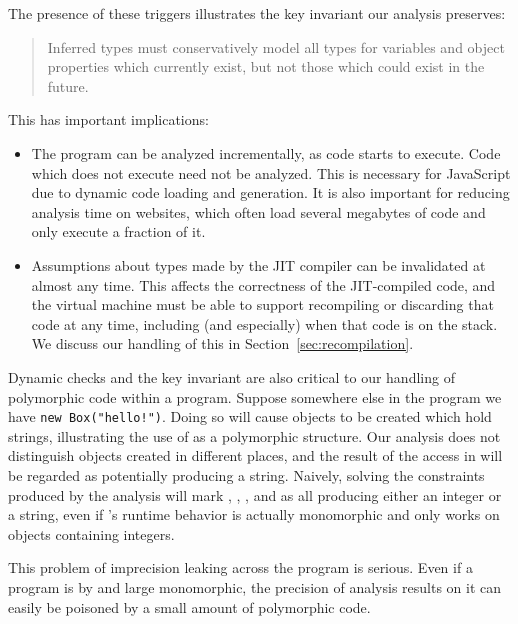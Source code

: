 The presence of these triggers illustrates the key invariant our analysis
preserves:
\begin{quote}
Inferred types must conservatively model all types for
variables and object properties which currently exist, but not those
which could exist in the future.
\end{quote}
This has important implications:

\begin{itemize}

\item The program can be analyzed incrementally, as code starts to execute.
Code which does not execute need not be analyzed.
This is necessary for JavaScript due to dynamic code loading
and generation. It is also important for reducing
analysis time on websites, which often load several megabytes of
code and only execute a fraction of it.

\item Assumptions about types made by the JIT compiler can be invalidated
at almost any time.
This affects the correctness of the JIT-compiled code, and the virtual machine
must be able to support recompiling or discarding that code at any time,
including (and especially) when that code is on the stack.
We discuss our handling of this in Section~\ref{sec:recompilation}.

\end{itemize}

Dynamic checks and the key invariant are also critical to our handling of polymorphic code
within a program. Suppose somewhere else in the program we have
\lstinline{new Box("hello!")}.
Doing so will cause  objects
to be created which hold strings,
illustrating the use of  as a polymorphic structure.
Our analysis does not distinguish  objects created in different
places, and the result of the  access in  will
be regarded as potentially producing a string.
Naively, solving the constraints produced by the analysis will mark
, , , and  as all producing
either an integer or a string, even if 's runtime behavior is actually monomorphic
and only works on  objects containing integers.

This problem of imprecision leaking across the program is serious. Even
if a program is by and large monomorphic, the precision of analysis results on
it can easily be poisoned by a small amount of polymorphic code.

